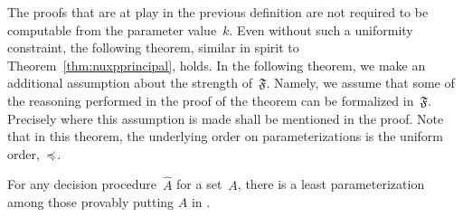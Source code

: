 The proofs that are at play in the previous definition are not required to be computable from the parameter value~$k$.
Even without such a uniformity constraint, the following theorem, similar in spirit to Theorem~\ref{thm:nuxpprincipal}, holds.
In the following theorem, we make an additional assumption about the strength of~$\mathfrak{F}$.
Namely, we assume that some of the reasoning performed in the proof of the theorem can be formalized in~$\mathfrak{F}$.
Precisely where this assumption is made shall be mentioned in the proof.
Note that in this theorem, the underlying order on parameterizations is the uniform order,~$\preccurlyeq$.
\begin{theorem}
\label{thm:xpprincipal}%
  For any decision procedure~$\hat{A}$ for a set~$A$, there is a least parameterization among those provably putting $\hat{A}$ in .
\end{theorem}
